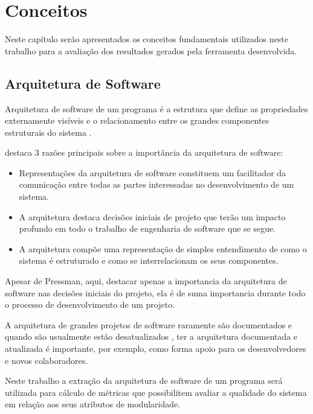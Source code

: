 
\chapter{Conceitos} \label{ch:conceitos}

Neste capítulo serão apresentados os conceitos fundamentais utilizados neste
trabalho para a avaliação dos resultados gerados pela ferramenta desenvolvida.

\section{Arquitetura de Software}

Arquitetura de software de um programa é a estrutura que define as propriedades
externamente visíveis e o relacionamento entre os grandes componentes
estruturais do sistema \cite{engenhariaDeSoftwarePressman}.

 destaca 3 razões principais sobre a
importância da arquitetura de software:

\begin{itemize}
\item Representações da arquitetura de software constituem um facilitador da
comunicação entre todas as partes interessadas no desenvolvimento de um
sistema.
\item A arquitetura destaca decisões iniciais de projeto que terão um impacto
profundo em todo o trabalho de engenharia de software que se segue.
\item A arquitetura compõe uma representação de simples entendimento de como o
sistema é estruturado e como se interrelacionam os seus componentes.
\end{itemize}

Apesar de Pressman, aqui, destacar apenas a importancia da arquitetura de
software nas decisões iniciais do projeto, ela é de suma importancia durante
todo o processo de desenvolvimento de um projeto.

A arquitetura de grandes projetos de software raramente são documentados e
quando são usualmente estão desatualizados
\cite{sourceVersusObjectCodeExtraction}, ter a arquitetura documentada e
atualizada é importante, por exemplo, como forma apoio para os desenvolvedores e novos
colaboradores.

Neste trabalho a extração da arquitetura de software de um programa será
utilizada para cálculo de métricas que possibilitem avaliar a qualidade do
sistema em relação aos seus atributos de modularidade.

